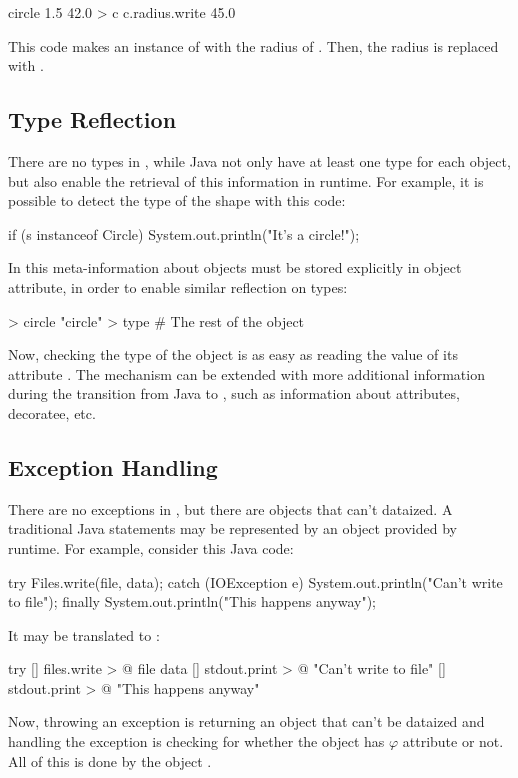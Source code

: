 \begin{ffcode}
circle 1.5 42.0 > c
c.radius.write 45.0
\end{ffcode}

This code makes an instance of  with the radius of .
Then, the radius is replaced with .

\subsection{Type Reflection}

There are no types in \eo{}, while Java not only have at least one type
for each object, but also enable the retrieval of this information in
runtime. For example, it is possible to detect the type of the shape
with this code:

\begin{ffcode}
if (s instanceof Circle) {
  System.out.println("It's a circle!");
}
\end{ffcode}

In \eo{} this meta-information about objects must be stored
explicitly in object attribute, in order to enable similar
reflection on types:

\begin{ffcode}
 > circle
  "circle" > type
  # The rest of the object
\end{ffcode}

Now, checking the type of the object is as easy as reading the
value of its attribute . The mechanism can be extended
with more additional information during the transition from
Java to \eo{}, such as information about attributes, decoratee, etc.

\subsection{Exception Handling}

There are no exceptions in \eo{}, but there are objects that
can't dataized. A traditional Java  statements
may be represented by an object  provided by \eo{} runtime.
For example, consider this Java code:

\begin{ffcode}
try {
  Files.write(file, data);
} catch (IOException e) {
  System.out.println("Can't write to file");
} finally {
  System.out.println("This happens anyway");
}
\end{ffcode}

It may be translated to \eo{}:

\begin{ffcode}
try
  []
    files.write > @
      file
      data
  []
    stdout.print > @
      "Can't write to file"
  []
    stdout.print > @
      "This happens anyway"
\end{ffcode}

Now, throwing an exception is returning an object that can't be
dataized and handling the exception is checking for whether the
object has $\varphi$ attribute or not. All of this is done
by the object .

